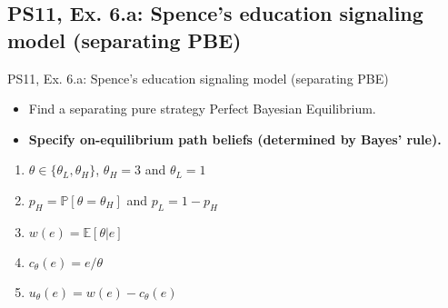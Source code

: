 \subsection{PS11, Ex. 6.a: Spence’s education signaling model (separating PBE)}
\begin{frame}{PS11, Ex. 6.a: Spence’s education signaling model (separating PBE)}
    \begin{itemize}
      \item[(a)] Find a separating pure strategy Perfect Bayesian Equilibrium.
    \end{itemize}\vspace{-8pt}
    \begin{multicols}{2}
      \begin{itemize}
        \item[Step 1:] \textbf{Specify on-equilibrium path beliefs (determined by Bayes' rule).}
      \end{itemize}
      \vfill\null\columnbreak
      \begin{enumerate}
        \item[Types:] $\theta\in\{\theta_L,\theta_H\}$, $\theta_H=3$ and $\theta_L=1$
        \item[Prob.:] $p_H=\mathbb{P}[\theta=\theta_H]$ and $p_L=1-p_H$
        \item[Wage:] $w(e)=\mathbb{E}[\theta|e]$
        \item[Cost:] $c_\theta(e)=e/\theta$
        \item[Utility:] $u_\theta(e)=w(e)-c_\theta(e)$
      \end{enumerate}
    \end{multicols}
    \vfill\null
\end{frame}
